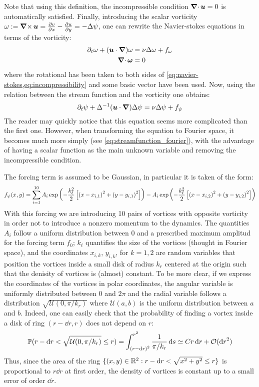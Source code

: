 \documentclass[../main.tex]{subfiles}
\begin{document}
Note that using this definition, the incompressible condition $\operatorname{\boldsymbol{\nabla}\cdot} \boldsymbol{u}=0$ is automatically satisfied. Finally, introducing the scalar vorticity $\omega := \operatorname{\boldsymbol{\nabla}\times} \boldsymbol{u} = \pdv{v}{x} - \pdv{u}{y}=-\Delta \psi$, one can rewrite the Navier-stokes equations in terms of the vorticity:
\begin{align}
	\partial_t \omega + (\boldsymbol{u} \cdot \grad) \omega & = \nu \Delta \omega + f_\omega \\
	\operatorname{\boldsymbol{\nabla}\cdot}{\boldsymbol{\omega}}                              & = 0
\end{align}
where the rotational has been taken to both sides of \cref{eq:navier-stokes,eq:incompressibility} and some basic vector have been used. Now, using the relation between the stream function and the vorticity one obtains:
\begin{equation}\label{eq:streamfunction}
	\partial_t \psi + \Delta^{-1} (\boldsymbol{u} \cdot \grad) \Delta \psi = \nu \Delta \psi + f_\psi
\end{equation}
The reader may quickly notice that this equation seems more complicated than the first one. However, when transforming the equation to Fourier space, it becomes much more simply (see \cref{eq:streamfunction_fourier}), with the advantage of having a scalar function as the main unknown variable and removing the incompressible condition.

The forcing term is assumed to be Gaussian, in particular it is taken of the form:
\begin{equation}
	f_\psi(x,y) = \sum_{i=1}^{10} A_i \operatorname{exp}\left(-\frac{k_\ell^2}{2}\left[{(x-x_{i,1})}^2 + {(y-y_{i,1})}^2\right]\right) - A_i\operatorname{exp}\left(-\frac{k_\ell^2}{2}\left[{(x-x_{i,2})}^2 + {(y-y_{i,2})}^2\right]\right)
\end{equation}
With this forcing we are introducing 10 pairs of vortices with opposite vorticity in order not to introduce a nonzero momentum to the dynamics. The quantities $A_i$ follow a uniform distribution between 0 and a prescribed maximum amplitud for the forcing term $f_0$; $k_\ell$ quantifies the size of the vortices (thought in Fourier space), and the coordinates $x_{i,k}$, $y_{i,k}$, for $k=1,2$ are random variables that position the vortices inside a small disk of radius $k_r$ centered at the origin such that the denisity of vortices is (almost) constant. To be more clear, if we express the coordinates of the vortices in polar coordinates, the angular variable is uniformly distributed between 0 and $2\pi$ and the radial variable follows a distribution $\sqrt{\mathcal{U}(0,\pi/k_r)}$ where $\mathcal{U}(a,b)$ is the uniform distribution between $a$ and $b$. Indeed, one can easily check that the probability of finding a vortex inside a disk of ring $(r-\dd{r},r)$ does not depend on $r$:
\begin{equation}
	\mathbb{P}(r-\dd{r} < \sqrt{\mathcal{U}(0,\pi/k_r)} \leq r) = \int_{{(r-\dd{r})}^2}^{r^2} \frac{1}{\pi/k_r} \dd{s} \simeq C r \dd{r} + \mathcal{O}(\dd{r}^2)
\end{equation}
Thus, since the area of the ring $\{(x,y) \in \mathbb{R}^2 : r-\dd{r} < \sqrt{x^2+y^2} \leq r\}$ is proportional to $r \dd{r}$ at first order, the density of vortices is constant up to a small error of order $\dd{r}$.
\end{document}
